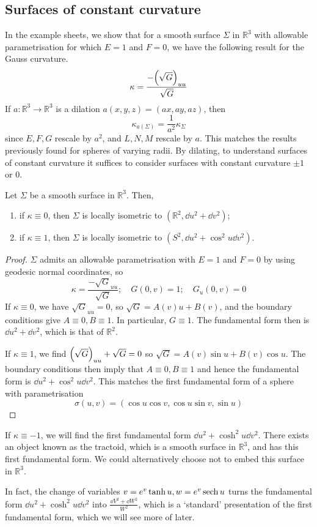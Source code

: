 \subsection{Surfaces of constant curvature}
In the example sheets, we show that for a smooth surface \( \Sigma \) in \( \mathbb R^3 \) with allowable parametrisation for which \( E = 1 \) and \( F = 0 \), we have the following result for the Gauss curvature.
\[
	\kappa = \frac{-\qty(\sqrt{G})_{uu}}{\sqrt{G}}
\]
If \( a \colon \mathbb R^3 \to \mathbb R^3 \) is a dilation \( a(x,y,z) = (ax,ay,az) \), then
\[
	\kappa_{a(\Sigma)} = \frac{1}{a^2} \kappa_\Sigma
\]
since \( E, F, G \) rescale by \( a^2 \), and \( L, N, M \) rescale by \( a \).
This matches the results previously found for spheres of varying radii.
By dilating, to understand surfaces of constant curvature it suffices to consider surfaces with constant curvature \( \pm 1 \) or 0.
\begin{proposition}
	Let \( \Sigma \) be a smooth surface in \( \mathbb R^3 \).
	Then,
	\begin{enumerate}
		\item if \( \kappa \equiv 0 \), then \( \Sigma \) is locally isometric to \( (\mathbb R^2, \dd{u^2} + \dd{v}^2) \);
		\item if \( \kappa \equiv 1 \), then \( \Sigma \) is locally isometric to \( (S^2, \dd{u}^2 + \cos^2 u \dd{v}^2) \).
	\end{enumerate}
\end{proposition}
\begin{proof}
	\( \Sigma \) admits an allowable parametrisation with \( E = 1 \) and \( F = 0 \) by using geodesic normal coordinates, so
	\[
		\kappa = \frac{-\sqrt{G}_{uu}}{\sqrt{G}};\quad G(0,v) = 1;\quad G_u(0,v) = 0
	\]
	If \( \kappa \equiv 0 \), we have \( \sqrt{G}_{uu} = 0 \), so \( \sqrt{G} = A(v) u + B(v) \), and the boundary conditions give \( A \equiv 0, B \equiv 1 \).
	In particular, \( G \equiv 1 \).
	The fundamental form then is \( \dd{u}^2 + \dd{v}^2 \), which is that of \( \mathbb R^2 \).

	If \( \kappa \equiv 1 \), we find \( \qty(\sqrt{G})_{uu} + \sqrt{G} = 0 \) so \( \sqrt{G} = A(v) \sin u + B(v) \cos u \).
	The boundary conditions then imply that \( A \equiv 0, B \equiv 1 \) and hence the fundamental form is \( \dd{u}^2 + \cos^2 u \dd{v}^2 \).
	This matches the first fundamental form of a sphere with parametrisation
	\[
		\sigma(u,v) = (\cos u \cos v, \cos u \sin v, \sin u)
	\]
\end{proof}
\begin{remark}
	If \( \kappa \equiv -1 \), we will find the first fundamental form \( \dd{u}^2 + \cosh^2 u \dd{v}^2 \).
	There exists an object known as the tractoid, which is a smooth surface in \( \mathbb R^3 \), and has this first fundamental form.
	We could alternatively choose not to embed this surface in \( \mathbb R^3 \).

	In fact, the change of variables \( v = e^v \tanh u, w = e^v \sech u \) turns the fundamental form \( \dd{u}^2 + \cosh^2 u \dd{v}^2 \) into \( \frac{\dd{V}^2 + \dd{W}^2}{W^2} \), which is a `standard' presentation of the first fundamental form, which we will see more of later.
\end{remark}

